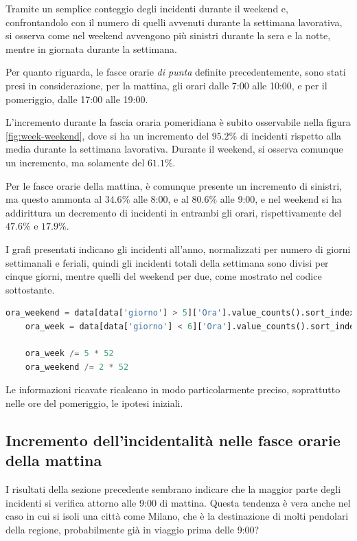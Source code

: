 \documentclass[a4paper,12pt]{report}
\newcommand{\quotestyle}[1]{\textit{#1}}
\begin{document}
Tramite un semplice conteggio degli incidenti durante il weekend e, 
confrontandolo con il numero di quelli avvenuti durante la 
settimana lavorativa, si osserva come nel weekend avvengono più sinistri 
durante la sera e la notte, mentre in giornata durante la settimana.

Per quanto riguarda, le fasce orarie \quotestyle{di punta} definite precedentemente, 
sono stati presi in considerazione, per la mattina, gli orari dalle 7:00 alle 10:00, 
e per il pomeriggio, dalle 17:00 alle 19:00.

L'incremento durante la fascia oraria pomeridiana è subito osservabile nella figura 
\ref{fig:week-weekend}, dove si ha un incremento del $95.2$\% di incidenti rispetto 
alla media durante la settimana lavorativa. 
Durante il weekend, si osserva comunque un incremento, ma solamente del $61.1$\%.

Per le fasce orarie della mattina, è comunque presente un incremento di sinistri, ma questo 
ammonta al $34.6$\% alle 8:00, e al $80.6$\% alle 9:00, e nel weekend si ha addirittura un 
decremento di incidenti in entrambi gli orari, rispettivamente del $47.6$\% e $17.9$\%.

I grafi presentati indicano gli incidenti all'anno, normalizzati per numero di 
giorni settimanali e feriali, quindi gli incidenti totali della settimana sono divisi 
per cinque giorni, mentre quelli del weekend per due, come mostrato nel codice sottostante.

\begin{lstlisting}[language=Python]
    ora_weekend = data[data['giorno'] > 5]['Ora'].value_counts().sort_index()
    ora_week = data[data['giorno'] < 6]['Ora'].value_counts().sort_index()

    ora_week /= 5 * 52
    ora_weekend /= 2 * 52
\end{lstlisting}

Le informazioni ricavate ricalcano in modo particolarmente preciso, soprattutto nelle ore del 
pomeriggio, le ipotesi iniziali.

\subsection{Incremento dell'incidentalità nelle fasce orarie della mattina}

I risultati della sezione precedente sembrano indicare che la maggior parte degli 
incidenti si verifica attorno alle 9:00 di mattina. 
Questa tendenza è vera anche nel caso in cui si isoli una città come Milano, 
che è la destinazione di molti pendolari della regione, probabilmente 
già in viaggio prima delle 9:00?
\end{document}
